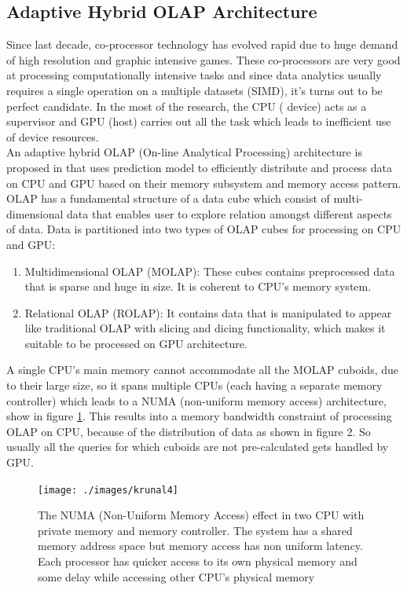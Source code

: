 \documentclass[runningheads,a4paper]{llncs}
\begin{document}
{\subsection*{Adaptive Hybrid OLAP Architecture}

Since last decade, co-processor technology has evolved rapid due to huge demand of high resolution and graphic intensive games. These co-processors are very good at processing computationally intensive tasks and since data analytics usually requires a single operation on a multiple datasets (SIMD), it's turns out to be perfect candidate. In the most of the research, the CPU ( device) acts as a supervisor and GPU (host) carries out all the task which leads to inefficient use of device resources. \\

An adaptive hybrid OLAP (On-line Analytical Processing) architecture is proposed in \cite{riha2013adaptive} that uses prediction model to efficiently distribute and process data on CPU and GPU based on their memory subsystem and memory access pattern. OLAP has a fundamental structure of a data cube which consist of multi-dimensional data that enables user to explore relation amongst different aspects of data. Data is partitioned into two types of OLAP cubes for processing on CPU and GPU:\\
\begin{enumerate}
	\item Multidimensional OLAP (MOLAP): These cubes contains preprocessed data that is sparse and huge in size. It is coherent to CPU's memory system.
	\item Relational OLAP (ROLAP): It contains data that is manipulated to appear like traditional OLAP with slicing and dicing functionality, which makes it suitable to be processed on GPU architecture.
\end{enumerate}

 A single CPU's main memory cannot accommodate all the MOLAP cuboids, due to their large size, so it spans multiple CPUs (each having a separate memory controller) which leads to a NUMA (non-uniform memory access) architecture, show in figure \ref{fig:nume_something}. This results into a memory bandwidth constraint of processing OLAP on CPU, because of the distribution of data as shown in figure 2. So usually all the queries for which cuboids are not pre-calculated gets handled by GPU.
 
 \begin{figure}[!htb]
 	\texttt{[image: ./images/krunal4]}
 	\centering
 	\caption{The NUMA (Non-Uniform Memory Access) effect in two CPU with private memory and memory controller. The system has a shared memory address space but memory access has non uniform latency. Each processor has quicker access to its own physical memory and some delay while accessing other CPU's physical memory }
 	\label{fig:nume_something}
 \end{figure}

}
\end{document}
